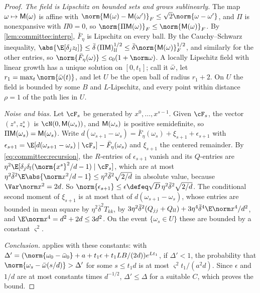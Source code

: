 \begin{refsection}
\begin{proof}
\emph{The field is Lipschitz on bounded sets and grows sublinearly.} The map $\omega\mapsto\mathsf{M}(\omega)$ is affine with $\norm{\committeeM(\omega)-\committeeM(\omega')}_F\le\sqrt2\norm{\omega-\omega'}$, and $\Pi$ is nonexpansive with $\Pi0=0$, so $\norm{\Pi\committeeM(\omega)}_F\le\norm{\committeeM(\omega)}_F$. By \cref{lem:committee:interp}, $\bar F_\eta$ is Lipschitz on every ball. By the Cauchy--Schwarz inequality, $\abs{\E[\delta_jz_l]}\le\bar\delta\,(\Pi\committeeM)_{ll}^{1/2}\le\bar\delta\norm{\committeeM(\omega)}_F^{1/2}$, and similarly for the other entries, so $\norm{\bar F_\eta(\omega)}\le c_0(1+\norm\omega)$. A locally Lipschitz field with linear growth has a unique solution on $[0,t_1]$; call it $\bar\omega$, let $r_1=\max_t\norm{\committeeOm(t)}$, and let $U$ be the open ball of radius $r_1+2$. On $U$ the field is bounded by some $B$ and $L$-Lipschitz, and every point within distance $\rho=1$ of the path lies in $U$.

\emph{Noise and bias.} Let $\cF_s$ be generated by $x^0,\dots,x^{s-1}$. Given $\cF_s$, the vector $(z^s,z_\star^s)$ is $\cN(0,\committeeM(\omega_s))$, and $\mathsf{M}(\omega_s)$ is positive semidefinite, so $\Pi\mathsf{M}(\omega_s)=\mathsf{M}(\omega_s)$. Write $d(\omega_{s+1}-\omega_s)=\bar F_\eta(\omega_s)+\xi_{s+1}+\epsilon_{s+1}$ with $\epsilon_{s+1}=\E[d(\omega_{s+1}-\omega_s)\mid\cF_s]-\bar F_\eta(\omega_s)$ and $\xi_{s+1}$ the centered remainder. By \eqref{eq:committee:recursion}, the $R$-entries of $\epsilon_{s+1}$ vanish and its $Q$-entries are $\eta^2\E[\delta_j\delta_l(\norm{x^s}^2/d-1)\mid\cF_s]$, which are at most $\eta^2\bar\delta^2\E\abs{\norm x^2/d-1}\le\eta^2\bar\delta^2\sqrt{2/d}$ in absolute value, because $\Var\norm x^2=2d$. So $\norm{\epsilon_{s+1}}\le\epsilon\defeq\sqrt D\,\eta^2\bar\delta^2\sqrt{2/d}$. The conditional second moment of $\xi_{s+1}$ is at most that of $d(\omega_{s+1}-\omega_s)$, whose entries are bounded in mean square by $\eta^2\bar\delta^2T_{kk}$, by $3\eta^2\bar\delta^2(Q_{jj}+Q_{ll})+3\eta^4\bar\delta^4\E\norm x^4/d^2$, and $\E\norm x^4=d^2+2d\le3d^2$. On the event $\{\omega_s\in U\}$ these are bounded by a constant $\varsigma^2$.

\emph{Conclusion.}  applies with these constants: with $\Delta'=(\norm{\omega_0-\committeeOm_0}+a+t_1\epsilon+t_1LB/(2d))e^{Lt_1}$, if $\Delta'<1$, the probability that $\norm{\omega_s-\committeeOm(s/d)}>\Delta'$ for some $s\le t_1d$ is at most $\varsigma^2t_1/(a^2d)$. Since $\epsilon$ and $1/d$ are at most constants times $d^{-1/2}$, $\Delta'\le\Delta$ for a suitable $C$, which proves the bound.


\end{proof}
\end{refsection}
